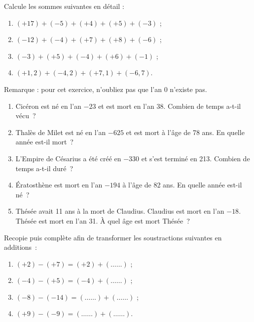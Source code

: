 \begin{exercice}
Calcule les sommes suivantes en détail :
\begin{enumerate}
 \item $(+ 17) + (- 5) + (+ 4) + (+ 5) + (- 3)$ ;
 \item $(- 12) + (- 4) + (+ 7) + (+ 8) + (- 6)$ ;
 \item $(- 3) + (+ 5) + (- 4) + (+ 6) + (- 1)$ ;
 \item $(+ 1,2) + (- 4,2) + (+ 7,1) + (- 6,7)$.
 \end{enumerate}
\end{exercice}


\begin{exercice}
Remarque : pour cet exercice, n'oubliez pas que l'an 0 n'existe pas.
\begin{enumerate}
 \item Cicéron est né en l'an $- 23$ et est mort en l'an 38. Combien de temps a-t-il vécu ?
 \item Thalès de Milet est né en l'an $- 625$ et est mort à l'âge de 78 ans. En quelle année est-il mort ?
 \item L'Empire de Césarius a été créé en $- 330$ et s'est terminé en 213. Combien de temps a-t-il duré ?
 \item Ératosthène est mort en l'an $- 194$ à l'âge de 82 ans. En quelle année est-il né ?
 \item Thésée avait 11 ans à la mort de Claudius. Claudius est mort en l'an $- 18$. Thésée est mort en l'an 31. À quel âge est mort Thésée ?
 \end{enumerate}
\end{exercice}




\begin{exercice}
Recopie puis complète afin de transformer les soustractions suivantes en additions :
\begin{enumerate}
 \item $(+ 2) - (+ 7) = (+ 2) + (\ldots \ldots)$ ;
 \item $(- 4) - (+ 5) = (- 4) + (\ldots \ldots)$ ;
 \item $(- 8) - (- 14) =  (\ldots \ldots) + (\ldots \ldots)$ ;
 \item $(+ 9) - (- 9) =  (\ldots \ldots) + (\ldots \ldots)$.
 \end{enumerate}
\end{exercice}

